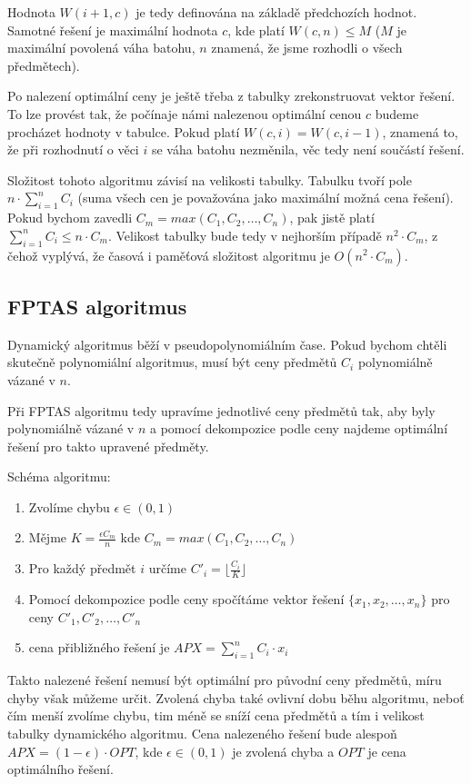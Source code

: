 \documentclass[11pt]{article}
\begin{document}
Hodnota $W(i+1, c)$ je tedy definována na základě předchozích hodnot. Samotné řešení je maximální hodnota $c$, kde platí $W(c, n) \leq M$ ($M$ je maximální povolená váha batohu, $n$ znamená, že jsme rozhodli o všech předmětech).

Po nalezení optimální ceny je ještě třeba z tabulky zrekonstruovat vektor řešení. To lze provést tak, že počínaje námi nalezenou optimální cenou $c$ budeme procházet hodnoty v tabulce. Pokud platí $W(c, i) = W(c, i - 1)$, znamená to, že při rozhodnutí o věci $i$ se váha batohu nezměnila, věc tedy není součástí řešení.

Složitost tohoto algoritmu závisí na velikosti tabulky. Tabulku tvoří pole $n \cdot \sum_{i=1}^n C_i$ (suma všech cen je považována jako maximální možná cena řešení). Pokud bychom zavedli $C_m = max(C_1, C_2,\ldots,C_n)$, pak jistě platí $\sum_{i=1}^n C_i \leq n \cdot C_m$. Velikost tabulky bude tedy v nejhorším případě $n^2 \cdot C_m$, z čehož vyplývá, že časová i paměťová složitost algoritmu je $O(n^2 \cdot C_m)$.

\subsection{FPTAS algoritmus}

Dynamický algoritmus běží v pseudopolynomiálním čase. Pokud bychom chtěli skutečně polynomiální algoritmus, musí být ceny předmětů $C_i$ polynomiálně vázané v $n$. 

Při FPTAS algoritmu tedy upravíme jednotlivé ceny předmětů tak, aby byly polynomiálně vázané v $n$ a pomocí dekompozice podle ceny najdeme optimální řešení pro takto upravené předměty.

Schéma algoritmu:
\begin{enumerate}
	\item Zvolíme chybu $\epsilon \in (0,1)$
	\item Mějme $K = \frac{\epsilon C_m}{n}$ kde $C_m = max(C_1, C_2,\ldots,C_n)$
	\item Pro každý předmět $i$ určíme $C'_i = \lfloor \frac{C_i}{K} \rfloor$
	\item Pomocí dekompozice podle ceny spočítáme vektor řešení $\{x_1, x_2,\ldots, x_n\}$ pro ceny $C'_1, C'_2,\ldots,C'_n$
	\item cena přibližného řešení je $APX = \sum_{i=1}^n C_i \cdot x_i$
\end{enumerate}

Takto nalezené řešení nemusí být optimální pro původní ceny předmětů, míru chyby však můžeme určit. Zvolená chyba také ovlivní dobu běhu algoritmu, neboť čím menší zvolíme chybu, tim méně se sníží cena předmětů a tím i velikost tabulky dynamického algoritmu. Cena nalezeného řešení bude alespoň $APX = (1 - \epsilon) \cdot OPT$, kde $\epsilon \in (0,1)$ je zvolená chyba a $OPT$ je cena optimálního řešení.\cite{kate}
\end{document}
